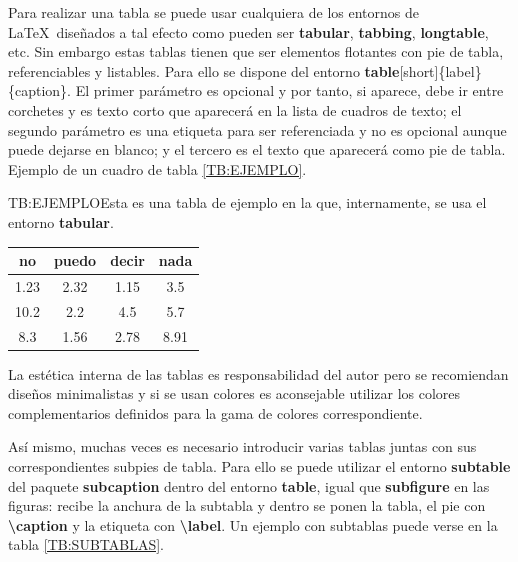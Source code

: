 Para realizar una tabla se puede usar cualquiera de los entornos de \LaTeX\ diseñados a tal efecto como pueden ser \textbf{tabular}, \textbf{tabbing}, \textbf{longtable}, etc. Sin embargo estas tablas tienen que ser elementos flotantes con pie de tabla, referenciables y listables. Para ello se dispone del entorno \textbf{table}{[short]}\{label\}\{caption\}. El primer parámetro es opcional y por tanto, si aparece, debe ir entre corchetes y es texto corto que aparecerá en la lista de cuadros de texto; el segundo parámetro es una etiqueta para ser referenciada y no es opcional aunque puede dejarse en blanco; y el tercero es el texto que aparecerá como pie de tabla. Ejemplo de un cuadro de tabla \ref{TB:EJEMPLO}.

\begin{table}[Tabla de ejemplo]{TB:EJEMPLO}{Esta es una tabla de ejemplo en la que, internamente, se usa el entorno \textbf{tabular}.}
  \begin{tabular}{cccc}
    \hline
    \textbf{no} & \textbf{puedo} & \textbf{decir} & \textbf{nada} \\
    \hline \hline
    1.23 & 2.32 & 1.15 & 3.5 \\
    10.2 & 2.2 & 4.5 & 5.7 \\
    8.3 & 1.56 & 2.78 & 8.91 \\
    \hline
  \end{tabular}
\end{table}

La estética interna de las tablas es responsabilidad del autor pero se recomiendan diseños minimalistas y si se usan colores es aconsejable utilizar los colores complementarios definidos para la gama de colores correspondiente.

Así mismo, muchas veces es necesario introducir varias tablas juntas con sus correspondientes subpies de tabla. Para ello se puede utilizar el entorno \textbf{subtable} del paquete \textbf{subcaption} dentro del entorno \textbf{table}, igual que \textbf{subfigure} en las figuras: recibe la anchura de la subtabla y dentro se ponen la tabla, el pie con \textbf{{\textbackslash}caption} y la etiqueta con \textbf{{\textbackslash}label}. Un ejemplo con subtablas puede verse en la tabla \ref{TB:SUBTABLAS}.

